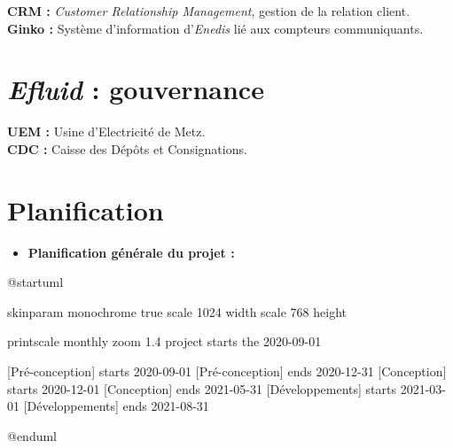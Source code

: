\documentclass[a4paper, 12pt]{report}
\begin{document}
\vspace{1cm}
\noindent\textbf{CRM :} \textit{Customer Relationship Management}, gestion de la relation client.\\
\noindent\textbf{Ginko :} Système d'information d'\textit{Enedis} lié aux compteurs communiquants.

\chapter{\textit{Efluid} : gouvernance}
\label{appendix:efluid-gouvernance}

\begin{center}
\end{center}

\vspace{1cm}
\noindent\textbf{UEM :} Usine d'Electricité de Metz.\\
\noindent\textbf{CDC :} Caisse des Dépôts et Consignations.

\chapter{Planification}
\label{appendix:planification}

\begin{itemize}
  \item \textbf{Planification générale du projet :}\\
\end{itemize}

\begin{center}
  \begin{plantuml}
    @startuml

    skinparam monochrome true
    scale 1024 width
    scale 768 height

    printscale monthly zoom 1.4
    project starts the 2020-09-01

    [Pré-conception] starts 2020-09-01
    [Pré-conception] ends 2020-12-31
    [Conception] starts 2020-12-01
    [Conception] ends 2021-05-31
    [Développements] starts 2021-03-01
    [Développements] ends 2021-08-31

    @enduml
  \end{plantuml}
\end{center}
\vspace{1cm}
\end{document}
